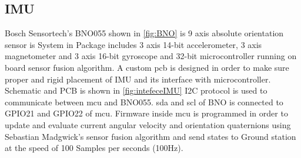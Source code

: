 \subsection{IMU}
Bosch Sensortech's BNO055 shown in \autoref{fig:BNO} is 9 axis absolute orientation sensor is System in Package includes 3 axis 14-bit accelerometer, 3 axis magnetometer and 3 axis 16-bit gyroscope  and 32-bit microcontroller running on board sensor fusion algorithm.\cite{web:ds_BNO055}
\noindent A custom  \acrshort{pcb} is designed in order to make sure proper and rigid placement of IMU and its interface with microcontroller. Schematic and PCB is shown in \autoref{fig:intefeceIMU} I2C protocol is used to communicate between \acrfull{mcu} and BNO055. \acrshort{sda} and \acrshort{scl} of BNO is connected to GPIO21 and GPIO22 of \acrshort{mcu}. Firmware inside \acrshort{mcu} is programmed in order to update and evaluate current angular velocity and orientation quaternions using Sebastian Madgwick's sensor fusion algorithm \cite{madgwick2010efficient} and send states to Ground station at the speed of 100 Samples per seconds (100Hz).

